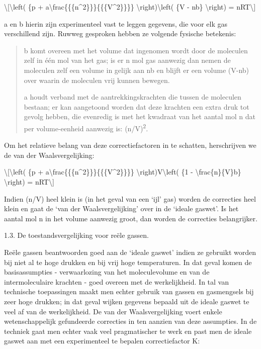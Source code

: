 \documentclass[]{article}
\begin{document}
\textbackslash{}{[}\textbackslash{}left( \{p +
a\textbackslash{}frac\{\{\{n\^{}2\}\}\}\{\{\{V\^{}2\}\}\}\}
\textbackslash{}right)\textbackslash{}left( \{V - nb\}
\textbackslash{}right) = nRT\textbackslash{}{]}

a en b hierin zijn experimenteel vast te leggen gegevens, die voor elk
gas verschillend zijn. Ruwweg gesproken hebben ze volgende fysische
betekenis:

\begin{quote}
b komt overeen met het volume dat ingenomen wordt door de moleculen zelf
in één mol van het gas; is er n mol gas aanwezig dan nemen de moleculen
zelf een volume in gelijk aan nb en blijft er een volume (V-nb) over
waarin de moleculen vrij kunnen bewegen.

a houdt verband met de aantrekkingskrachten die tussen de moleculen
bestaan; er kan aangetoond worden dat deze krachten een extra druk tot
gevolg hebben, die evenredig is met het kwadraat van het aantal mol n
dat per volume-eenheid aanwezig is: (n/V)\textsuperscript{2}.
\end{quote}

Om het relatieve belang van deze correctiefactoren in te schatten,
herschrijven we de van der Waalsvergelijking:

\textbackslash{}{[}\textbackslash{}left( \{p +
a\textbackslash{}frac\{\{\{n\^{}2\}\}\}\{\{\{V\^{}2\}\}\}\}
\textbackslash{}right)V\textbackslash{}left( \{1 -
\textbackslash{}frac\{n\}\{V\}b\} \textbackslash{}right) =
nRT\textbackslash{}{]}

Indien (n/V) heel klein is (in het geval van een `ijl' gas) worden de
correcties heel klein en gaat de `van der Waalsvergelijking' over in de
`ideale gaswet'. Is het aantal mol n in het volume aanwezig groot, dan
worden de correcties belangrijker.

1.3. De toestandsvergelijking voor reële gassen.

Reële gassen beantwoorden goed aan de `ideale gaswet' indien ze gebruikt
worden bij niet al te hoge drukken en bij vrij hoge temperaturen. In dat
geval komen de basisassumpties - verwaarlozing van het moleculevolume en
van de intermoleculaire krachten - goed overeen met de werkelijkheid. In
tal van technische toepassingen maakt men echter gebruik van gassen en
gasmengsels bij zeer hoge drukken; in dat geval wijken gegevens bepaald
uit de ideale gaswet te veel af van de werkelijkheid. De van der
Waalsvergelijking voert enkele wetenschappelijk gefundeerde correcties
in ten aanzien van deze assumpties. In de techniek gaat men echter vaak
veel pragmatischer te werk en past men de ideale gaswet aan met een
experimenteel te bepalen correctiefactor K:
\end{document}
